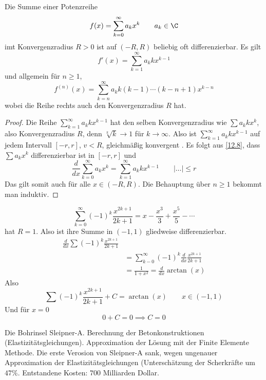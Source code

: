 \documentclass[a4paper,10pt]{scrartcl}
\begin{document}
\begin{thm}
\label{12.11}
Die Summe einer Potenzreihe
\[
f(x)=\sum_{k=0}^\infty a_kx^k \qquad a_k\in\C
\]
imt Konvergenzradius $R>0$ ist auf $(-R,R)$ beliebig oft differenzierbar.
Es gilt
\[
f'(x)=\sum_{k=1}^\infty a_kkx^{k-1}
\]
und allgemein für $n\ge 1$,
\[
f^{(n)}(x)=\sum_{k=n}^\infty a_k k(k-1)\dotsb (k-n+1)x^{k-n}
\]
wobei die Reihe rechts auch den Konvergenzradius $R$ hat.
\begin{proof}
Die Reihe $\sum_{k=1}^\infty a_kkx^{k-1}$ hat den selben Konvergenzradius wie $\sum a_kkx^k$, also Konvergenzradius $R$, denn $\sqrt[k]{k}\to 1$ für $k\to\infty$.
Also ist $\sum_{k=1}^\infty a_kkx^{k-1}$ auf jedem Intervall $[-r,r]$, $v<R$, gleichmäßig konvergent
.
Es folgt aus \ref{12.8}, dass $\sum a_kx^k$ differenzierbar ist in $[-r,r]$ und
\[
\frac d{dx}\sum_{k=0}^\infty a_kx^k=\sum_{k=1}^\infty a_kkx^{k-1} \qquad |…|\le r
\]
Das gilt somit auch für alle $x\in (-R,R)$.
Die Behauptung über $n\ge 1$ bekommt man induktiv.
\end{proof}
\begin{ex*}
\[
\sum_{k=0}^\infty (-1)^k\frac{x^{2k+1}}{2k+1}=x-\frac{x^3}3 +\frac{x^5}5-\dotsb
\]
hat $R=1$. Also ist ihre Summe in $(-1,1)$ gliedweise differenzierbar.
\begin{align*}
\frac d{dx} \sum (-1)^k \frac{x^{2k+1}}{2k+1} \\
&= \sum_{k-0}^\infty (-1)^k\frac d{dx} \frac {x^{2k+1}}{2k+1}\\
&= \frac 1{1+x^2} = \frac d{dx} \arctan(x)
\end{align*}
Also
\[
\sum (-1)^k\frac{x^{2k+1}}{2k+1}+C=\arctan(x) \qquad x\in (-1,1)
\]
Und für $x=0$
\[
0+C = 0 \implies C=0
\]
\end{ex*}
\end{thm}

\begin{note}
Die Bohrinsel Sleipner-A.
Berechnung der Betonkonstruktionen (Elastizitätsgleichungen).
Approximation der Lösung mit der Finite Elemente Methode.
Die erste Verosion von Sleipner-A sank, wegen ungenauer Approximation der Elastizitätsgleichungen (Unterschätzung der Scherkräfte um $47\%$.
Entstandene Kosten: $700$ Milliarden Dollar.
\end{note}
\begin{note}
\end{note}
\end{document}

